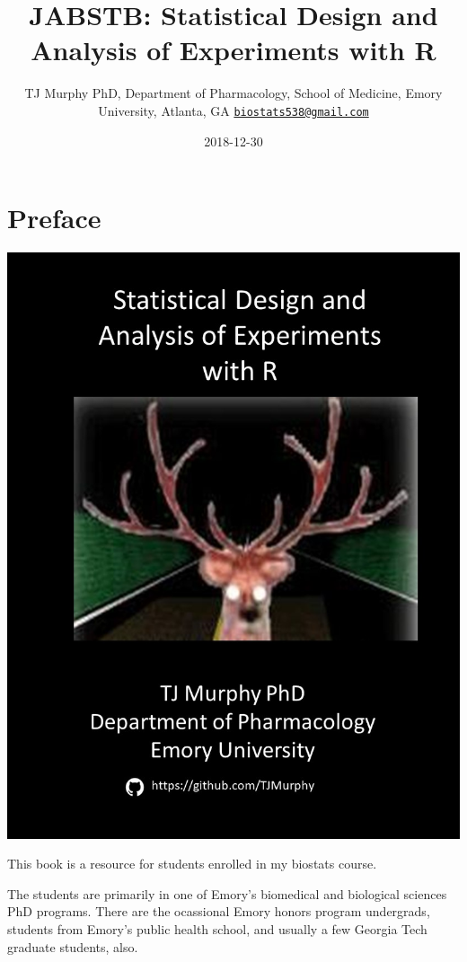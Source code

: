 \documentclass[]{book}
\title{JABSTB: Statistical Design and Analysis of Experiments with R}
\author{TJ Murphy PhD, Department of Pharmacology, School of Medicine, Emory University, Atlanta, GA \href{mailto:biostats538@gmail.com}{\nolinkurl{biostats538@gmail.com}}}
\date{2018-12-30}
\begin{document}
\maketitle

{
\setcounter{tocdepth}{1}
\tableofcontents
}
\hypertarget{preface}{%
\chapter*{Preface}\label{preface}}

\includegraphics[width=11.33in]{images/book_cover}

This book is a resource for students enrolled in my biostats course.

The students are primarily in one of Emory's biomedical and biological sciences PhD programs. There are the ocassional Emory honors program undergrads, students from Emory's public health school, and usually a few Georgia Tech graduate students, also.
\end{document}

